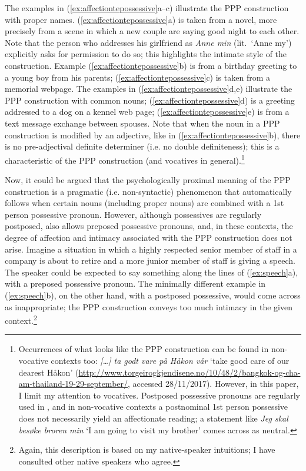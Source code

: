 \documentclass[output=paper]{langsci/langscibook}
\begin{document}
\noindent The examples in (\ref{ex:affectiontepossessive}a--c) illustrate the
PPP construction with proper names.   (\ref{ex:affectiontepossessive}a) is
taken from a novel, more precisely from a scene in which a new couple are
saying good night to each other. Note that the person who addresses his
girlfriend as \emph{Anne min} (lit.\ `Anne my') explicitly  asks for permission
to do so; this highlights the intimate style  of the construction. Example
(\ref{ex:affectiontepossessive}b) is from a birthday greeting to a young boy
from his  parents;   (\ref{ex:affectiontepossessive}c) is taken from a memorial
webpage. The examples in (\ref{ex:affectiontepossessive}d,e) illustrate the
PPP construction with common nouns;  (\ref{ex:affectiontepossessive}d) is a
greeting addressed to a dog on a kennel web page;
(\ref{ex:affectiontepossessive}e) is from a text message exchange between
spouses. Note that when  the noun in a PPP construction is modified by an
adjective, like in (\ref{ex:affectiontepossessive}b), there is no
pre-adjectival definite determiner (i.e. no double definiteness); this is a
characteristic of the PPP construction (and vocatives in
general).\footnote{Occurrences of what looks like the PPP construction can be
    found in non-vocative contexts too: \emph{[\dots{}] ta godt vare på
    \textit{Håkon} \textit{vår}} `take good care of our dearest Håkon'
    (\url{http://www.torgeirogkjendisene.no/10/48/2/bangkok-og-cha-am-thailand-19-29-september/},
    accessed 28/11/2017). However, in this paper, I limit my attention to
    vocatives. Postposed possessive pronouns are regularly used in ,
    and in non-vocative contexts a postnominal 1st person possessive does not
    necessarily yield an affectionate reading; a statement like \emph{Jeg skal
besøke \textit{broren} \textit{min} } `I am going to visit my brother' comes
across as neutral. }

Now,  it could  be argued that  the psychologically proximal meaning of the PPP
construction is a pragmatic (i.e. non-syntactic) phenomenon that automatically
follows when certain nouns (including proper nouns) are  combined with a 1st
person  possessive pronoun. However, although possessives are regularly
postposed,  also allows preposed possessive pronouns, and, in
these contexts, the degree of affection and intimacy associated with the PPP
construction does not  arise. Imagine a situation in which a highly respected
senior member of staff in a company is about to retire and a more junior
member of staff is giving a  speech. The speaker could be expected to say
something along the lines of (\ref{ex:speech}a), with a preposed possessive
pronoun. The minimally different example in (\ref{ex:speech}b), on the other
hand, with a postposed possessive, would come across as inappropriate; the PPP
construction conveys too much intimacy in the given context.\footnote{Again,
this description is based on my native-speaker intuitions; I have consulted
other native speakers who agree.}
\end{document}

